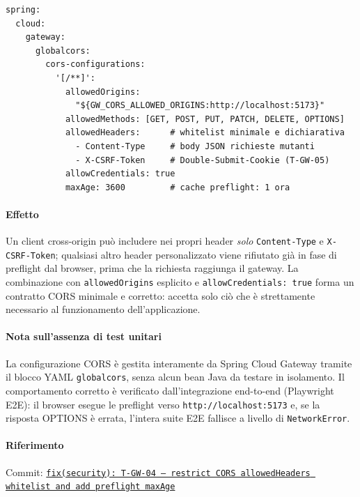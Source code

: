 ﻿\documentclass[a4paper,12pt]{report}
\newcommand{\commitref}[2]{\texttt{\small \href{https://github.com/diegoandruccioli/hotel-pms/commit/#1}{#2}}}
\begin{document}
\begin{securebox}[title={Configurazione Sicura --- api-gateway.yml (feature/secure-coding-hardening)}]
\begin{lstlisting}[style=yaml]
spring:
  cloud:
    gateway:
      globalcors:
        cors-configurations:
          '[/**]':
            allowedOrigins:
              "${GW_CORS_ALLOWED_ORIGINS:http://localhost:5173}"
            allowedMethods: [GET, POST, PUT, PATCH, DELETE, OPTIONS]
            allowedHeaders:      # whitelist minimale e dichiarativa
              - Content-Type     # body JSON richieste mutanti
              - X-CSRF-Token     # Double-Submit-Cookie (T-GW-05)
            allowCredentials: true
            maxAge: 3600         # cache preflight: 1 ora
\end{lstlisting}
\end{securebox}

\paragraph{Effetto}
Un client cross-origin può includere nei propri header \emph{solo} \texttt{Content-Type}
e \texttt{X-CSRF-Token}; qualsiasi altro header personalizzato viene rifiutato già in
fase di preflight dal browser, prima che la richiesta raggiunga il gateway.
La combinazione con \texttt{allowedOrigins} esplicito e \texttt{allowCredentials: true}
forma un contratto CORS minimale e corretto: accetta solo ciò che è strettamente
necessario al funzionamento dell'applicazione.

\paragraph{Nota sull'assenza di test unitari}
La configurazione CORS è gestita interamente da Spring Cloud Gateway tramite il
blocco YAML \texttt{globalcors}, senza alcun bean Java da testare in isolamento.
Il comportamento corretto è verificato dall'integrazione end-to-end (Playwright E2E):
il browser esegue le preflight verso \texttt{http://localhost:5173} e, se la risposta
OPTIONS è errata, l'intera suite E2E fallisce a livello di \texttt{NetworkError}.

\paragraph{Riferimento} Commit: \commitref{73e2788}{fix(security): T-GW-04 --- restrict CORS allowedHeaders whitelist and add preflight maxAge}
\end{document}
